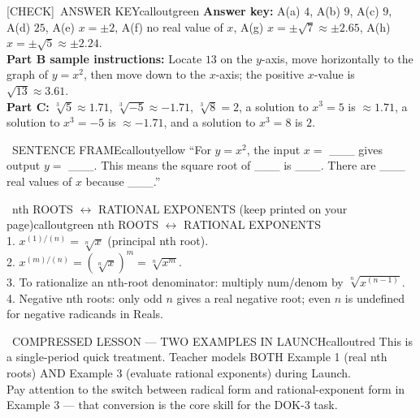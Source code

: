 \documentclass[11pt]{article}
\newcommand{\IconCheck}{[CHECK]}
\newcommand{\teacheranswerbox}[2]{%
  \begin{callout}{#1}{calloutgreen}
  #2
  \end{callout}
}
\begin{document}
\teacheranswerbox{\IconCheck\ ANSWER KEY}{%
\textbf{Answer key:} A(a) \(4\), A(b) \(9\), A(c) \(9\), A(d) \(25\), A(e) \(x = \pm 2\), A(f) no real value of \(x\), A(g) \(x = \pm \sqrt{7} \approx \pm 2.65\), A(h) \(x = \pm \sqrt{5} \approx \pm 2.24\).\\
\textbf{Part B sample instructions:} Locate \(13\) on the \(y\)-axis, move horizontally to the graph of \(y=x^2\), then move down to the \(x\)-axis; the positive \(x\)-value is \(\sqrt{13} \approx 3.61\).\\
\textbf{Part C:} \(\sqrt[3]{5} \approx 1.71\), \(\sqrt[3]{-5} \approx -1.71\), \(\sqrt[3]{8} = 2\), a solution to \(x^3 = 5\) is \(\approx 1.71\), a solution to \(x^3 = -5\) is \(\approx -1.71\), and a solution to \(x^3 = 8\) is \(2\).
}

\begin{callout}{\IconTarget\ SENTENCE FRAME}{calloutyellow}
``For \(y = x^2\), the input \(x =\) \_\_\_ gives output \(y =\) \_\_\_. This means the square root of \_\_\_ is \_\_\_. There are \_\_\_ real values of \(x\) because \_\_\_.'' 
\end{callout}


\begin{callout}{\IconBook\ nth ROOTS \(\leftrightarrow\) RATIONAL EXPONENTS (keep printed on your page)}{calloutgreen}
nth ROOTS \(\leftrightarrow\) RATIONAL EXPONENTS\\
1. \(x^{(1)/(n)} = \sqrt[n]{x}\) (principal nth root).\\
2. \(x^{(m)/(n)} = (\sqrt[n]{x})^m = \sqrt[n]{x^m}\).\\
3. To rationalize an nth-root denominator: multiply num/denom by \(\sqrt[n]{x^{(n-1)}}\).\\
4. Negative nth roots: only odd \(n\) gives a real negative root; even \(n\) is undefined for negative radicands in Reals.
\end{callout}

\begin{callout}{\IconWarn\ COMPRESSED LESSON --- TWO EXAMPLES IN LAUNCH}{calloutred}
This is a single-period quick treatment. Teacher models BOTH Example 1 (real nth roots) AND Example 3 (evaluate rational exponents) during Launch.\\
Pay attention to the switch between radical form and rational-exponent form in Example 3 --- that conversion is the core skill for the DOK-3 task.
\end{callout}
\end{document}
